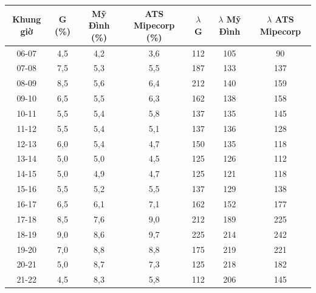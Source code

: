 \begin{tabular}{ccccccc}
\toprule
\textbf{Khung giờ} & \textbf{G (\%)} & \textbf{Mỹ Đình (\%)} & \textbf{ATS Mipecorp (\%)} & \textbf{$\lambda$ G} & \textbf{$\lambda$ Mỹ Đình} & \textbf{$\lambda$ ATS Mipecorp} \\
\midrule
06-07 & 4{,}5 & 4{,}2 & 3{,}6 & 112 & 105 & 90 \\
07-08 & 7{,}5 & 5{,}3 & 5{,}5 & 187 & 133 & 137 \\
08-09 & 8{,}5 & 5{,}6 & 6{,}4 & 212 & 140 & 159 \\
09-10 & 6{,}5 & 5{,}5 & 6{,}3 & 162 & 138 & 158 \\
10-11 & 5{,}5 & 5{,}4 & 5{,}8 & 137 & 135 & 145 \\
11-12 & 5{,}5 & 5{,}4 & 5{,}1 & 137 & 136 & 128 \\
12-13 & 6{,}0 & 5{,}4 & 4{,}7 & 150 & 135 & 118 \\
13-14 & 5{,}0 & 5{,}0 & 4{,}5 & 125 & 126 & 112 \\
14-15 & 5{,}0 & 4{,}9 & 4{,}7 & 125 & 121 & 118 \\
15-16 & 5{,}5 & 5{,}2 & 5{,}5 & 137 & 129 & 138 \\
16-17 & 6{,}5 & 6{,}1 & 7{,}1 & 162 & 152 & 177 \\
17-18 & 8{,}5 & 7{,}6 & 9{,}0 & 212 & 189 & 225 \\
18-19 & 9{,}0 & 8{,}6 & 9{,}7 & 225 & 214 & 242 \\
19-20 & 7{,}0 & 8{,}8 & 8{,}8 & 175 & 219 & 221 \\
20-21 & 5{,}0 & 8{,}7 & 7{,}3 & 125 & 218 & 182 \\
21-22 & 4{,}5 & 8{,}3 & 5{,}8 & 112 & 206 & 145 \\
\bottomrule
\end{tabular}
